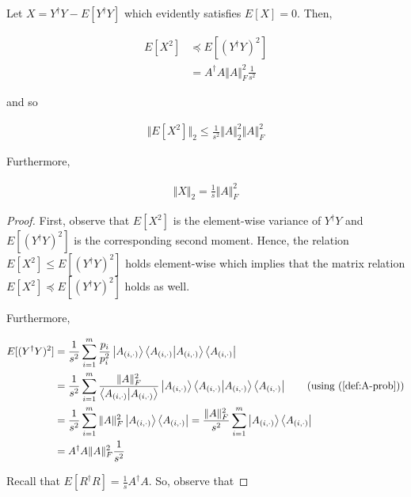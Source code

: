\documentclass[main.tex]{subfiles}
\begin{document}
\begin{lemma}
	Let $X = Y^\dag Y - E[Y^\dag Y]$ which evidently satisfies $E[X] = 0$. Then,
	
	\begin{align}
	E[X^2] &\preceq E[(Y^\dag Y)^2] \\
	&= A^\dag A \Vert A \Vert_F^2 \frac{1}{s^2}	
	\end{align}
	
	and so 
	
	\begin{align}
	\label{eq:expect-x-2}
	\Vert E[X^2] \Vert_2 \leq \frac{1}{s^2} \Vert A \Vert_2^2 \Vert A \Vert_F^2	
	\end{align}

	
	Furthermore,
	
	\begin{align}
	\Vert X \Vert_2 = \frac{1}{s} \Vert A \Vert^2_F	
	\end{align}
\begin{proof}
First, observe that $E[X^2]$ is the element-wise variance of $Y^\dag Y$ and $E[(Y^\dag Y)^2]$ is the corresponding second moment. Hence, the relation $E[X^2] \leq E[(Y^\dag Y)^2]$ holds element-wise which implies that the matrix relation $E[X^2] \preceq E[(Y^\dag Y)^2]$ holds as well.

Furthermore, 

\begin{align*}
E[(Y^\dag Y)^2] &= \frac{1}{s^2} \sum_{i = 1}^m \frac{p_{i}}{p_{i}^2} \ket{A_{(i, \cdot)}}\bra{A_{(i, \cdot)}}\ket{A_{(i, \cdot)}}\bra{A_{(i, \cdot)}} \\
&= \frac{1}{s^2} \sum_{i = 1}^m \frac{\Vert A \Vert_F^2}{\bra{A_{(i, \cdot)}}\ket{A_{(i, \cdot)}}} \ket{A_{(i, \cdot)}}\bra{A_{(i, \cdot)}}\ket{A_{(i, \cdot)}}\bra{A_{(i, \cdot)}}\tag{using (\ref{def:A-prob})}\\
&= \frac{1}{s^2} \sum_{i = 1}^m \Vert A \Vert_F^2 \ket{A_{(i, \cdot)}}\bra{A_{(i, \cdot)}} = \frac{\Vert A \Vert_F^2}{s^2} \sum_{i = 1}^m  \ket{A_{(i, \cdot)}}\bra{A_{(i, \cdot)}} \\
&= A^\dag A \Vert A \Vert_F^2 \frac{1}{s^2}	
\end{align*}

Recall that $E[R^\dag R] = \frac{1}{s} A^\dag A$. So, observe that


\end{proof}
\end{lemma}
\end{document}

